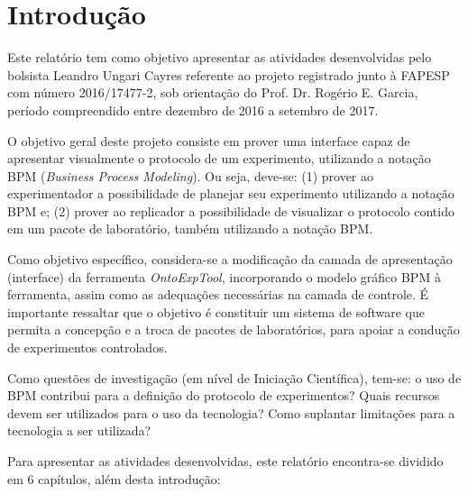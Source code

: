 \chapter{Introdução}

Este relatório tem como objetivo apresentar as atividades desenvolvidas pelo bolsista Leandro Ungari Cayres referente ao projeto  registrado junto à FAPESP com número 2016/17477-2, sob orientação do Prof. Dr. Rogério E. Garcia, período compreendido entre dezembro de 2016 a setembro de 2017.

O objetivo geral deste projeto consiste em prover uma interface capaz de apresentar visualmente o protocolo de um experimento, utilizando a notação BPM (\textit{Business Process Modeling}). Ou seja, deve-se: (1) prover ao experimentador a possibilidade de planejar seu experimento utilizando a notação BPM e; (2) prover ao replicador a possibilidade de visualizar o protocolo contido em um pacote de laboratório, também utilizando a notação BPM.

Como objetivo específico, considera-se a modificação da camada de apresentação (interface) da ferramenta \textit{OntoExpTool}, incorporando o modelo gráfico BPM à ferramenta, assim como as adequações necessárias na camada de controle. É importante ressaltar que o objetivo é constituir um sistema de software que permita a concepção e a troca de pacotes de laboratórios, para apoiar a condução de experimentos controlados.

Como questões de investigação (em nível de Iniciação Científica), tem-se: o uso de BPM contribui para a definição do protocolo de experimentos? Quais recursos devem ser utilizados para o uso da tecnologia? Como suplantar limitações para a tecnologia a ser utilizada?

Para apresentar as atividades desenvolvidas, este relatório encontra-se dividido em $6$ capítulos, além desta introdução:

